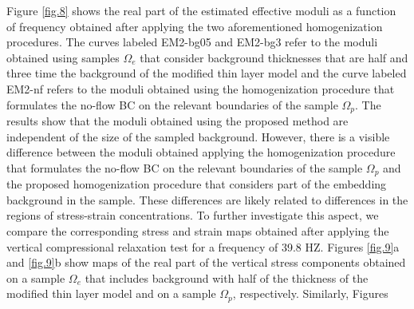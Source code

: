 \documentclass[draft]{agujournal2019}
\begin{document}
Figure \ref{fig.8} shows the real part of the estimated effective moduli as a function of frequency obtained after applying the two aforementioned homogenization procedures.
The curves labeled EM2-bg05 and EM2-bg3 refer to the moduli obtained using samples $\Omega_e$ that consider background thicknesses that are half and three time the background of the modified thin layer model and the curve labeled EM2-nf refers to the moduli obtained using the homogenization procedure that formulates the no-flow BC on the relevant boundaries of the sample $\Omega_p$. The results show that the moduli obtained using the proposed method are independent of the size of the sampled background. However, there is a visible difference between the moduli obtained applying the homogenization procedure that formulates the no-flow BC on the relevant boundaries of the sample $\Omega_p$ and the proposed homogenization procedure that considers part of the embedding background in the sample. These differences  are likely  related to differences in the regions of stress-strain concentrations. To further investigate this aspect, we compare the corresponding  stress and strain maps obtained after applying the vertical compressional relaxation test for a frequency of 39.8 HZ. Figures \ref{fig.9}a and \ref{fig.9}b show maps of the real part of the vertical stress components obtained on a sample $\Omega_e$ that includes background with half of the thickness of the modified thin layer model and on a sample $\Omega_p
$, respectively. Similarly, Figures
\end{document}
